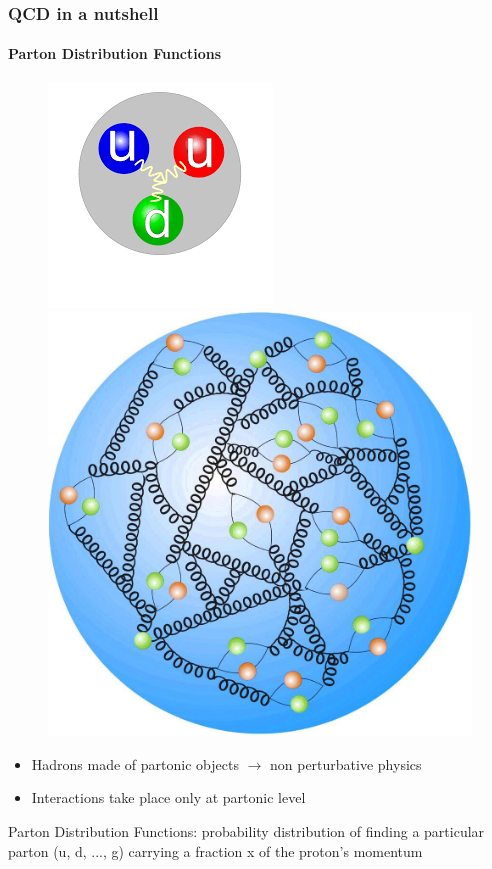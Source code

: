 \documentclass[aspectratio=43]{beamer}
\begin{document}
\begin{frame}

	\frametitle{QCD in a nutshell}
	\framesubtitle{Parton Distribution Functions}
	
	\begin{figure}
		\includegraphics[width = 0.5\linewidth]{plots/proton.png}
		\endminipage\hfill
		\includegraphics[width = 0.4\linewidth]{plots/proton2.jpg}
		\endminipage
	\end{figure}
	

	\begin{itemize}
		\item Hadrons made of partonic objects $\longrightarrow$ non perturbative physics
		\item Interactions take place only at partonic level
	\end{itemize}

	{\color{blue}Parton Distribution Functions: probability distribution of finding a particular parton (u, d, ..., g) carrying a fraction x of the proton's momentum}

\end{frame}
\end{document}
